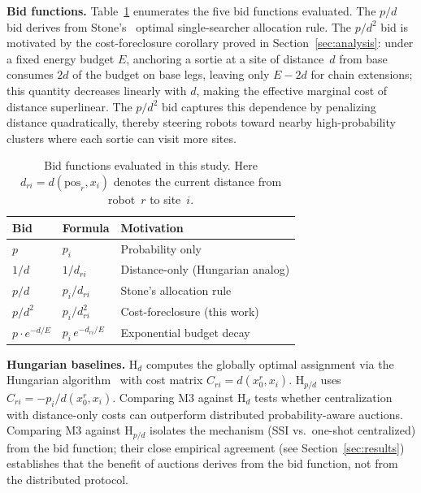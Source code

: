 \documentclass[conference]{IEEEtran}
\begin{document}
\textbf{Bid functions.}
Table~\ref{tab:bids} enumerates the five bid functions evaluated.
The $p/d$ bid derives from Stone's~\cite{Stone1975} optimal single-searcher
allocation rule.
The $p/d^2$ bid is motivated by the cost-foreclosure corollary proved in
Section~\ref{sec:analysis}: under a fixed energy budget $E$, anchoring a
sortie at a site of distance~$d$ from base consumes $2d$ of the budget on
base legs, leaving only $E - 2d$ for chain extensions; this quantity
decreases linearly with $d$, making the effective marginal cost of distance
superlinear.
The $p/d^2$ bid captures this dependence by penalizing distance quadratically,
thereby steering robots toward nearby high-probability clusters where each
sortie can visit more sites.

\begin{table}[ht]
\centering
\caption{Bid functions evaluated in this study.
Here $d_{ri} = d(\mathrm{pos}_r, x_i)$ denotes the current distance
from robot~$r$ to site~$i$.}\label{tab:bids}
\vspace{2pt}
\begin{tabular}{@{}lll@{}}
\toprule
\textbf{Bid} & \textbf{Formula} & \textbf{Motivation} \\
\midrule
$p$                   & $p_i$                      & Probability only           \\
$1/d$                 & $1/d_{ri}$                 & Distance-only (Hungarian analog) \\
$p/d$                 & $p_i / d_{ri}$             & Stone's allocation rule~\cite{Stone1975} \\
$p/d^2$               & $p_i / d_{ri}^2$           & Cost-foreclosure (this work) \\
$p \cdot e^{-d/E}$    & $p_i\, e^{-d_{ri}/E}$     & Exponential budget decay   \\
\bottomrule
\end{tabular}
\end{table}

\textbf{Hungarian baselines.}
$\mathrm{H}_d$ computes the globally optimal assignment via the Hungarian
algorithm~\cite{Kuhn1955} with cost matrix $C_{ri} = d(x_0^r, x_i)$.
$\mathrm{H}_{p/d}$ uses $C_{ri} = -p_i / d(x_0^r, x_i)$.
Comparing M3 against $\mathrm{H}_d$ tests whether centralization with
distance-only costs can outperform distributed probability-aware auctions.
Comparing M3 against $\mathrm{H}_{p/d}$ isolates the mechanism (SSI
vs.\ one-shot centralized) from the bid function; their close empirical
agreement (see Section~\ref{sec:results}) establishes that the benefit of
auctions derives from the bid function, not from the distributed protocol.
\end{document}
